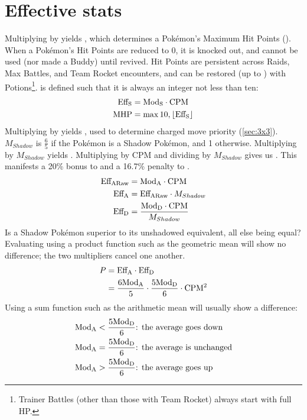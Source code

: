 \section{Effective stats\label{sec:effectivestats}}
Multiplying  by \CPM{} yields , which determines a Pokémon's Maximum Hit Points (\MHP).
When a Pokémon's Hit Points are reduced to 0, it is knocked out, and cannot be
 used (nor made a Buddy) until revived.
Hit Points are persistent across Raids, Max Battles, and Team Rocket encounters,
 and can be restored (up to \MHP) with Potions\footnote{Trainer Battles (other
 than those with Team Rocket) always start with full HP.}.
\MHP{} is defined such that it is always an integer not less than ten:
\begin{align*}
  \mbox{$\text{Eff}_\text{S}$} &= \mbox{$\text{Mod}_\text{S}$} \cdot \mbox{CPM}{} \\
  \mbox{MHP}{} &= \max{10, \lfloor \mbox{$\text{Eff}_\text{S}$} \rfloor}
\end{align*}
Multiplying  by \CPM{} yields , used to determine charged move priority (\autoref{sec:3x3}).
$M_{Shadow}$ is $\frac{6}{5}$ if the Pokémon is a Shadow Pokémon, and 1 otherwise.
Multiplying  by $M_{Shadow}$ yields .
Multiplying  by CPM and dividing by $M_{Shadow}$ gives us .
This manifests a 20\% bonus to  and a 16.7\% penalty to .
\begin{align*}
  \mbox{$\text{Eff}_\text{ARaw}$} &= \mbox{$\text{Mod}_\text{A}$} \cdot \mbox{CPM}{}\\
  \mbox{$\text{Eff}_\text{A}$} &= \mbox{$\text{Eff}_\text{ARaw}$} \cdot M_{Shadow} \\
  \mbox{$\text{Eff}_\text{D}$} &= \frac{\mbox{$\text{Mod}_\text{D}$} \cdot \mbox{CPM}{}}{M_{Shadow}}
\end{align*}
Is a Shadow Pokémon superior to its unshadowed equivalent, all else being equal?
Evaluating using a product function such as the geometric mean will show no difference;
 the two multipliers cancel one another.
\begin{align*}
  P &= \mbox{$\text{Eff}_\text{A}$} \cdot \mbox{$\text{Eff}_\text{D}$}\\
  &= \frac{6\mbox{$\text{Mod}_\text{A}$}}{5} \cdot \frac{5\mbox{$\text{Mod}_\text{D}$}}{6} \cdot \mbox{CPM}{}^2
\end{align*}
Using a sum function such as the arithmetic mean will usually show a difference:
\begin{align*}
  \mbox{$\text{Mod}_\text{A}$} &< \frac{5\mbox{$\text{Mod}_\text{D}$}}{6}\text{: the average goes down}\\
  \mbox{$\text{Mod}_\text{A}$} &= \frac{5\mbox{$\text{Mod}_\text{D}$}}{6}\text{: the average is unchanged}\\
  \mbox{$\text{Mod}_\text{A}$} &> \frac{5\mbox{$\text{Mod}_\text{D}$}}{6}\text{: the average goes up}
\end{align*}

